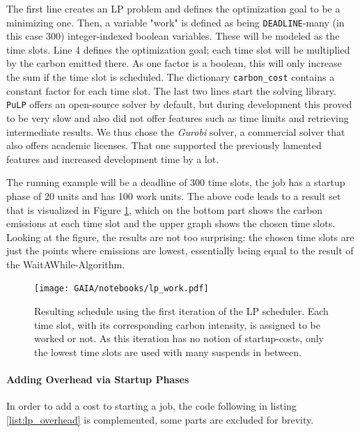 The first line creates an LP problem and defines the optimization goal to be a minimizing one. 
Then, a variable "work" is defined as being \verb|DEADLINE|-many (in this case 300) integer-indexed boolean variables. 
These will be modeled as the time slots.
Line 4 defines the optimization goal; each time slot will be multiplied by the carbon emitted there. As one factor is a boolean, this will only increase the sum if the time slot is scheduled. The dictionary \verb|carbon_cost| contains a constant factor for each time slot.
The last two lines start the solving library. 
\verb|PuLP| offers an open-source solver by default, but during development this proved to be very slow and also did not offer features such as time limits and retrieving intermediate results.
We thus chose the \emph{Gurobi} solver, a commercial solver that also offers academic licenses. 
That one supported the previously lamented features and increased development time by a lot. 

The running example will be a deadline of 300 time slots, the job has a startup phase of 20 units and has 100 work units. 
The above code leads to a result set that is visualized in Figure \ref{fig:lp_work},
which on the bottom part shows the carbon emissions at each time slot and the upper graph shows the chosen time slots.
Looking at the figure, the results are not too surprising: the chosen time slots are just the points where emissions are lowest, essentially being equal to the result of the WaitAWhile-Algorithm.

\begin{figure}
    \texttt{[image: GAIA/notebooks/lp\_work.pdf]}
    \caption{Resulting schedule using the first iteration of the LP scheduler. Each time slot, with its corresponding carbon intensity, is assigned to be worked or not. As this iteration has no notion of startup-costs, only the lowest time slots are used with many suspends in between.}
    \label{fig:lp_work}
\end{figure}    

\paragraph{Adding Overhead via Startup Phases}

In order to add a cost to starting a job, the code following in listing \ref{list:lp_overhead} is complemented, some parts are excluded for brevity.

